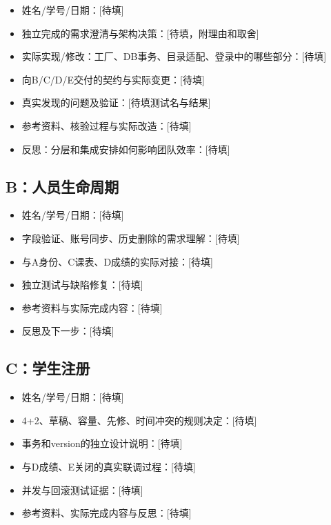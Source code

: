 \documentclass[UTF8,11pt,a4paper]{ctexart}
\providecommand{\tightlist}{\setlength{\itemsep}{0pt}\setlength{\parskip}{0pt}}
\begin{document}
\begin{itemize}
\tightlist
\item
  姓名/学号/日期：{[}待填{]}
\item
  独立完成的需求澄清与架构决策：{[}待填，附理由和取舍{]}
\item
  实际实现/修改：工厂、DB事务、目录适配、登录中的哪些部分：{[}待填{]}
\item
  向B/C/D/E交付的契约与实际变更：{[}待填{]}
\item
  真实发现的问题及验证：{[}待填测试名与结果{]}
\item
  参考资料、核验过程与实际改造：{[}待填{]}
\item
  反思：分层和集成安排如何影响团队效率：{[}待填{]}
\end{itemize}

\hypertarget{bux4ebaux5458ux751fux547dux5468ux671f}{%
\subsection{B：人员生命周期}\label{bux4ebaux5458ux751fux547dux5468ux671f}}

\begin{itemize}
\tightlist
\item
  姓名/学号/日期：{[}待填{]}
\item
  字段验证、账号同步、历史删除的需求理解：{[}待填{]}
\item
  与A身份、C课表、D成绩的实际对接：{[}待填{]}
\item
  独立测试与缺陷修复：{[}待填{]}
\item
  参考资料与实际完成内容：{[}待填{]}
\item
  反思及下一步：{[}待填{]}
\end{itemize}

\hypertarget{cux5b66ux751fux6ce8ux518c}{%
\subsection{C：学生注册}\label{cux5b66ux751fux6ce8ux518c}}

\begin{itemize}
\tightlist
\item
  姓名/学号/日期：{[}待填{]}
\item
  4+2、草稿、容量、先修、时间冲突的规则决定：{[}待填{]}
\item
  事务和version的独立设计说明：{[}待填{]}
\item
  与D成绩、E关闭的真实联调过程：{[}待填{]}
\item
  并发与回滚测试证据：{[}待填{]}
\item
  参考资料、实际完成内容与反思：{[}待填{]}
\end{itemize}
\end{document}
